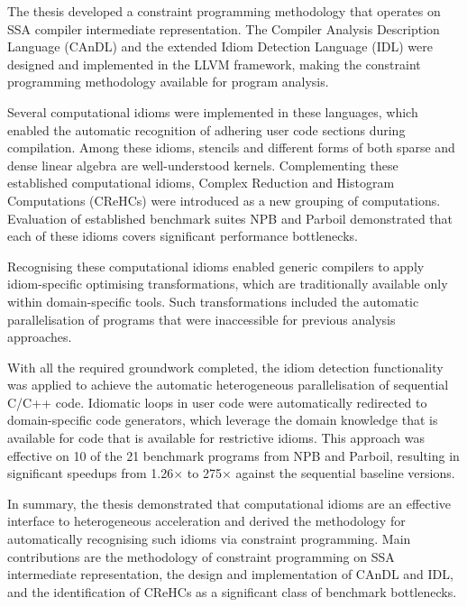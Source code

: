 
    The thesis developed a constraint programming methodology that operates on
    SSA compiler intermediate representation.
    The Compiler Analysis Description Language (CAnDL) and the extended Idiom
    Detection Language (IDL) were designed and implemented in the LLVM
    framework, making the constraint programming methodology available for
    program analysis.

    Several computational idioms were implemented in these languages, which
    enabled the automatic recognition of adhering user code sections during
    compilation.
    Among these idioms, stencils and different forms of both sparse and
    dense linear algebra are well-understood kernels.
    Complementing these established computational idioms, Complex Reduction and
    Histogram Computations (CReHCs) were introduced as a new grouping of
    computations.
    Evaluation of established benchmark suites NPB and Parboil demonstrated that
    each of these idioms covers significant performance bottlenecks.

    Recognising these computational idioms enabled generic compilers to apply
    idiom-specific optimising transformations, which are traditionally available
    only within domain-specific tools.
    Such transformations included the automatic parallelisation of programs that
    were inaccessible for previous analysis approaches.

    With all the required groundwork completed, the idiom detection
    functionality was applied to achieve the automatic heterogeneous
    parallelisation of sequential C/C++ code.
    Idiomatic loops in user code were automatically redirected to
    domain-specific code generators, which leverage the domain knowledge that
    is available for code that is available for restrictive idioms.
    This approach was effective on 10 of the 21 benchmark programs from NPB and
    Parboil, resulting in significant speedups from 1.26$\times$  to 275$\times$
    against the sequential baseline versions.

    In summary, the thesis demonstrated that computational idioms are an
    effective interface to heterogeneous acceleration and derived the
    methodology for automatically recognising such idioms via constraint
    programming.
    Main contributions are the methodology of constraint programming on SSA
    intermediate representation, the design and implementation of CAnDL and IDL,
    and the identification of CReHCs as a significant class of benchmark
    bottlenecks.


